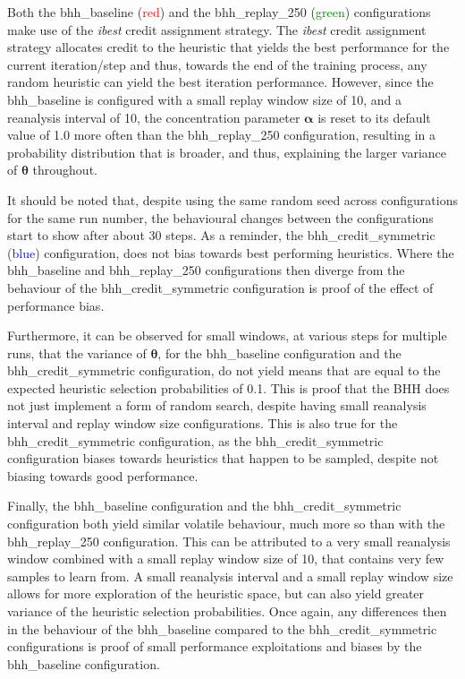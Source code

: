 Both the bhh\_baseline (\textcolor{red}{red}) and the bhh\_replay\_250 (\textcolor{green}{green}) configurations make use of the \textit{ibest} credit assignment strategy. The \textit{ibest} credit assignment strategy allocates credit to the heuristic that yields the best performance for the current iteration/step and thus, towards the end of the training process, any random heuristic can yield the best iteration performance. However, since the bhh\_baseline is configured with a small replay window size of 10, and a reanalysis interval of 10, the concentration parameter $\boldsymbol{\alpha}$ is reset to its default value of 1.0 more often than the bhh\_replay\_250 configuration, resulting in a probability distribution that is broader, and thus, explaining the larger variance of $\boldsymbol{\theta}$ throughout.

It should be noted that, despite using the same random seed across configurations for the same run number, the behavioural changes between the configurations start to show after about 30 steps. As a reminder, the bhh\_credit\_symmetric (\textcolor{blue}{blue}) configuration, does not bias towards best performing heuristics. Where the bhh\_baseline and bhh\_replay\_250 configurations then diverge from the behaviour of the bhh\_credit\_symmetric configuration is proof of the effect of performance bias.

Furthermore, it can be observed for small windows, at various steps for multiple runs, that the variance of $\boldsymbol{\theta}$, for the bhh\_baseline configuration and the bhh\_credit\_symmetric configuration, do not yield means that are equal to the expected heuristic selection probabilities of 0.1. This is proof that the \acs{BHH} does not just implement a form of random search, despite having small reanalysis interval and replay window size configurations. This is also true for the bhh\_credit\_symmetric configuration, as the bhh\_credit\_symmetric configuration biases towards heuristics that happen to be sampled, despite not biasing towards good performance.

Finally, the bhh\_baseline configuration and the bhh\_credit\_symmetric configuration both yield similar volatile behaviour, much more so than with the bhh\_replay\_250 configuration. This can be attributed to a very small reanalysis window combined with a small replay window size of 10, that contains very few samples to learn from. A small reanalysis interval and a small replay window size allows for more exploration of the heuristic space, but can also yield greater variance of the heuristic selection probabilities. Once again, any differences then in the behaviour of the bhh\_baseline compared to the bhh\_credit\_symmetric configurations is proof of small performance exploitations and biases by the bhh\_baseline configuration.

